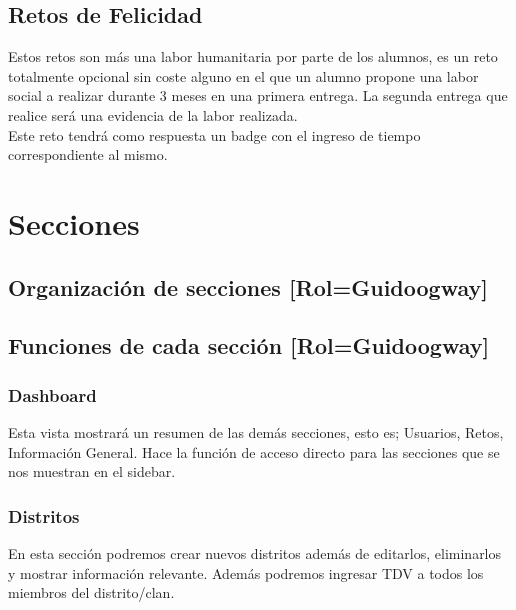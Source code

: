 \subsection{Retos de Felicidad}
Estos retos son más una labor humanitaria por parte de los alumnos, es un reto totalmente opcional sin coste alguno en el que un alumno propone una labor social a realizar durante 3 meses en una primera entrega. La segunda entrega que realice será una evidencia de la labor realizada.\\

Este reto tendrá como respuesta un badge con el ingreso de tiempo correspondiente al mismo.

\newpage

\section{Secciones}

\subsection{Organización de secciones [Rol=Guidoogway]}

\newpage


\subsection{Funciones de cada sección [Rol=Guidoogway]}
\subsubsection{Dashboard}
Esta vista mostrará un resumen de las demás secciones, esto es; Usuarios, Retos, Información General. Hace la función de acceso directo para las secciones que se nos muestran en el sidebar.

\subsubsection{Distritos}
En esta sección podremos crear nuevos distritos además de editarlos, eliminarlos y mostrar información relevante. Además podremos ingresar TDV a todos los miembros del distrito/clan.

